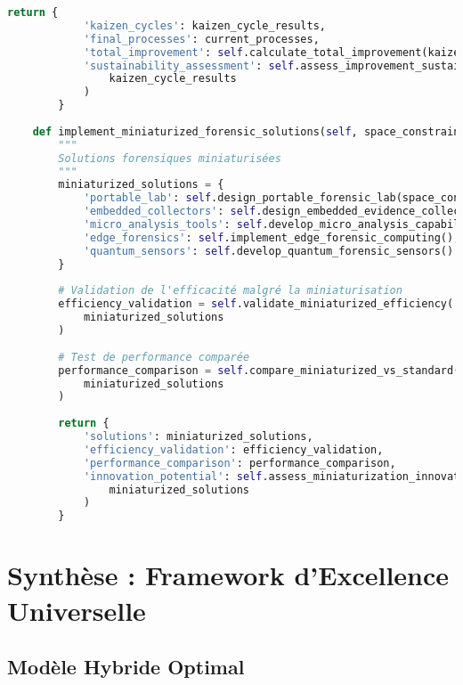 \begin{lstlisting}[language=Python, caption=Framework japonais de perfectionnement forensique]
        return {
            'kaizen_cycles': kaizen_cycle_results,
            'final_processes': current_processes,
            'total_improvement': self.calculate_total_improvement(kaizen_cycle_results),
            'sustainability_assessment': self.assess_improvement_sustainability(
                kaizen_cycle_results
            )
        }
    
    def implement_miniaturized_forensic_solutions(self, space_constraints):
        """
        Solutions forensiques miniaturisées
        """
        miniaturized_solutions = {
            'portable_lab': self.design_portable_forensic_lab(space_constraints),
            'embedded_collectors': self.design_embedded_evidence_collectors(),
            'micro_analysis_tools': self.develop_micro_analysis_capabilities(),
            'edge_forensics': self.implement_edge_forensic_computing(),
            'quantum_sensors': self.develop_quantum_forensic_sensors()
        }
        
        # Validation de l'efficacité malgré la miniaturisation
        efficiency_validation = self.validate_miniaturized_efficiency(
            miniaturized_solutions
        )
        
        # Test de performance comparée
        performance_comparison = self.compare_miniaturized_vs_standard(
            miniaturized_solutions
        )
        
        return {
            'solutions': miniaturized_solutions,
            'efficiency_validation': efficiency_validation,
            'performance_comparison': performance_comparison,
            'innovation_potential': self.assess_miniaturization_innovation_potential(
                miniaturized_solutions
            )
        }
\end{lstlisting}

\section{Synthèse : Framework d'Excellence Universelle}

\subsection{Modèle Hybride Optimal}

